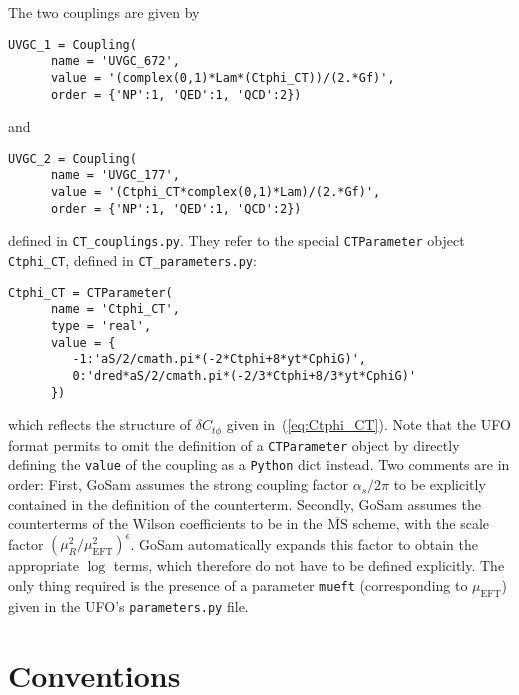 \documentclass[11pt,a4paper]{refrep}
\newcommand{\gosam}{{\sc GoSam}\xspace}
\newcommand{\python}{{\tt Python}\xspace}
\begin{document}
The two couplings are given by
\begin{lstlisting}[gobble=3,%
     basicstyle=\ttfamily]
   UVGC_1 = Coupling(
      name = 'UVGC_672',
      value = '(complex(0,1)*Lam*(Ctphi_CT))/(2.*Gf)',
      order = {'NP':1, 'QED':1, 'QCD':2})
\end{lstlisting}
and
\begin{lstlisting}[gobble=3,%
     basicstyle=\ttfamily]
   UVGC_2 = Coupling(
      name = 'UVGC_177',
      value = '(Ctphi_CT*complex(0,1)*Lam)/(2.*Gf)',
      order = {'NP':1, 'QED':1, 'QCD':2})
\end{lstlisting}
defined in \texttt{CT\_couplings.py}. They refer to the special \texttt{CTParameter} object \texttt{Ctphi\_CT}, defined in \texttt{CT\_parameters.py}:
\begin{lstlisting}[gobble=3,%
     basicstyle=\ttfamily]
   Ctphi_CT = CTParameter(
      name = 'Ctphi_CT',
      type = 'real',
      value = {
         -1:'aS/2/cmath.pi*(-2*Ctphi+8*yt*CphiG)',
         0:'dred*aS/2/cmath.pi*(-2/3*Ctphi+8/3*yt*CphiG)'
      })
\end{lstlisting}
which reflects the structure of $\delta C_{t\phi}$ given in~(\ref{eq:Ctphi_CT}). Note that the UFO format permits to omit the definition of a \texttt{CTParameter} object by directly defining the \texttt{value} of the coupling as a \python dict instead.
Two comments are in order: First, \gosam assumes the strong coupling factor $\alpha_s/2\pi$ to be explicitly contained in the definition of the counterterm. Secondly, \gosam assumes the counterterms of the Wilson coefficients to be in the $\overline{\text{MS}}$ scheme, with the scale factor $\left(\mu_R^2/\mu_\mathrm{EFT}^2\right)^\epsilon$. \gosam automatically expands this factor to obtain the appropriate $\log$ terms, which therefore do not have to be defined explicitly. The only thing required is the presence of a parameter \texttt{mueft} (corresponding to $\mu_\mathrm{EFT}$) given in the UFO's \texttt{parameters.py} file.


\appendix

\chapter{Conventions}
\label{sec:conventions}
\end{document}
